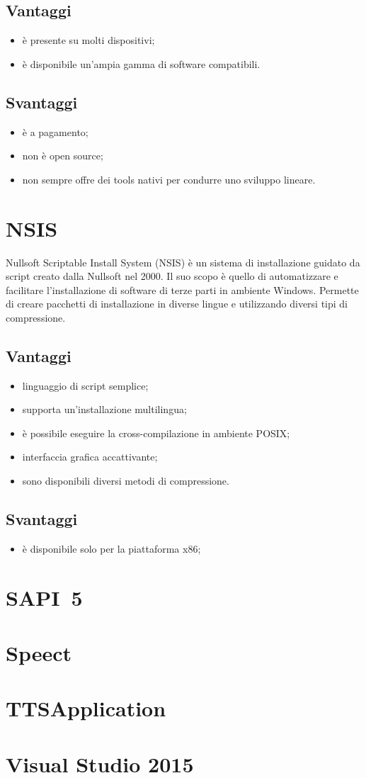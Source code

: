 \subsection*{Vantaggi}
\begin{itemize}
	\item è presente su molti dispositivi;
	\item è disponibile un'ampia gamma di software compatibili.
\end{itemize}
\subsection*{Svantaggi}
\begin{itemize}
	\item è a pagamento;
	\item non è open source;
	\item non sempre offre dei tools nativi per condurre uno sviluppo lineare.
\end{itemize}
\section{NSIS}
Nullsoft Scriptable Install System (NSIS) è un sistema di installazione guidato da script creato dalla Nullsoft nel 2000. Il suo scopo è quello di automatizzare e facilitare l'installazione di software di terze parti in ambiente Windows. Permette di creare pacchetti di installazione in diverse lingue e utilizzando diversi tipi di compressione.
\subsection*{Vantaggi}
\begin{itemize}
	\item linguaggio di script semplice;
	\item supporta un'installazione multilingua;
	\item è possibile eseguire la cross-compilazione in ambiente POSIX;
	\item interfaccia grafica accattivante;
	\item sono disponibili diversi metodi di compressione.
\end{itemize}
\subsection*{Svantaggi}
\begin{itemize}
	\item è disponibile solo per la piattaforma x86;
\end{itemize}
\section{SAPI~5}
\section{Speect}
\section{TTSApplication}
\section{Visual Studio 2015}
